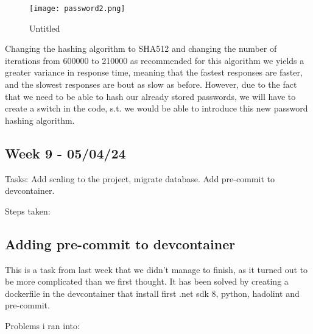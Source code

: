 \begin{figure}
\centering
\texttt{[image: password2.png]}
\caption{Untitled}
\end{figure}

Changing the hashing algorithm to SHA512 and changing the number of iterations from 600000 to 210000 as recommended for this algorithm we yields a greater variance in response time, meaning that the fastest responses are faster, and the slowest responses are bout as slow as before. However, due to the fact that we need to be able to hash our already stored passwords, we will have to create a switch in the code, s.t. we would be able to introduce this new password hashing algorithm.

\subsection{Week 9 - 05/04/24}
\label{log:week9}

Tasks: Add scaling to the project, migrate database. Add pre-commit to
devcontainer.

Steps taken:

\subsection{Adding pre-commit to devcontainer}
\label{log:adding-pre-commit-to-devcontainer}

This is a task from last week that we didn't manage to finish, as it turned out to be more complicated than we first thought. It has been solved by creating a dockerfile in the devcontainer that install first .net sdk 8, python, hadolint and pre-commit.

Problems i ran into:

